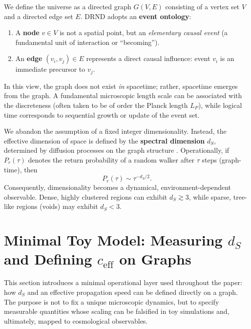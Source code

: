 \documentclass[12pt]{iopart}
\begin{document}
We define the universe as a directed graph $G(V, E)$ consisting of a vertex set $V$ and a directed edge set $E$.
DRND adopts an \textbf{event ontology}:
\begin{enumerate}
    \item A \textbf{node} $v \in V$ is not a spatial point, but an \textit{elementary causal event} (a fundamental unit of interaction or ``becoming'').
    \item An \textbf{edge} $(v_i, v_j) \in E$ represents a direct causal influence: event $v_i$ is an immediate precursor to $v_j$.
\end{enumerate}
In this view, the graph does not exist \textit{in} spacetime; rather, spacetime emerges from the graph. A fundamental microscopic length scale can be associated with the discreteness (often taken to be of order the Planck length $L_P$), while logical time corresponds to sequential growth or update of the event set.

We abandon the assumption of a fixed integer dimensionality. Instead, the effective dimension of space is defined by the \textbf{spectral dimension} $d_S$, determined by diffusion processes on the graph structure \cite{Ambjorn2005}. Operationally, if $P_r(\tau)$ denotes the return probability of a random walker after $\tau$ steps (graph-time), then
\begin{equation}
P_r(\tau) \sim \tau^{-d_S/2}.
\end{equation}
Consequently, dimensionality becomes a dynamical, environment-dependent observable. Dense, highly clustered regions can exhibit $d_S \gtrsim 3$, while sparse, tree-like regions (voids) may exhibit $d_S < 3$.

\section{Minimal Toy Model: Measuring \texorpdfstring{$d_S$}{dS} and Defining \texorpdfstring{$c_{\mathrm{eff}}$}{ceff} on Graphs}
\label{sec:toy}

This section introduces a minimal operational layer used throughout the paper: how $d_S$ and an effective propagation speed can be defined directly on a graph. The purpose is not to fix a unique microscopic dynamics, but to specify measurable quantities whose scaling can be falsified in toy simulations and, ultimately, mapped to cosmological observables.
\end{document}
